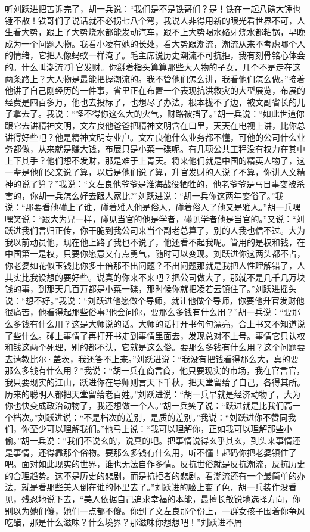 \documentclass[12pt,oneside]{book}
\begin{document}
听刘跃进把苦诉完了，胡一兵说：``我们是不是铁哥们？是！铁在一起八磅大锤也锤不散！铁哥们了说话就不必拐七八个弯，我说人非得用新的眼光看世界不可，人生看大势，跟上了大势烧水都能发动汽车，跟不上大势喝水硌牙烧水都粘锅，早晚成为一个问题人物。我看小凌有她的长处，看大势跟潮流，潮流从来不考虑哪个人的情绪，它把人像蚂蚁一样淹了。毛主席说历史潮流不可抗拒，我有刻骨铭心体会的。什么叫潮流?升官发财。你掰着指头算算那些大人物的子女，几个不是走在这两条路上？大人物是最能把握潮流的。我不管他们怎么讲，我看他们怎么做。''接着他讲了自己刚经历的一件事，省里正在布置一个表现抗洪救灾的大型展览，布展的经费是四百多万，他也去投标了，也想尽了办法，根本拢不了边，被文副省长的儿子拿去了。我说：``怪不得你这么大的火气，财路被挡了。''胡一兵说：``如此世道你跟它去讲精神文明，文左良他爸爸把精神文明含在口里，天天在电视上讲，比你总讲得好些吧？他是精神文明专业户。文左良他什么业务都不懂，可他的公司什么业务都做，从来就是赚大钱，布展只是小菜一碟呢。有几项公共工程没有权力在其中上下其手？他们想不发财，那是难于上青天。将来他们就是中国的精英人物了，这一辈是他们父亲说了算，以后是他们说了算，升官发财的人说了不算，你讲人文精神的说了算？''我说：``文左良他爷爷是淮海战役牺牲的，他老爷爷是马日事变被杀害的，你胡一兵怎么好去跟人家比?''刘跃进说：``胡一兵你这两年变俗了。''我说：``那要看他碰上了谁，碰着雅人他是俗人，碰着俗人了他又是雅人。''胡一兵嘿嘿笑说：``跟大为兄一样，碰见当官的他是学者，碰见学者他是当官的。''又说：``刘跃进我们言归正传，你干脆到我公司来当个副老总算了，别的人我也信不过。大为我以前动员他，现在他上路了我也不说了，他还看不起我呢。管用的是权和钱，在中国第一是权，只要你愿意又有点勇气，随时可以变现。刘跃进你这两头都不占，你老婆如花似玉钱比你多十倍那不出问题？不出问题那就是我把人性理解错了，人其实比我设想的要好些。说真的你来不来吧？把公司做大了，那就不是几千几万块钱的事，到那天几百万都是小菜一碟，那时候你就把凌若云镇住了。''刘跃进摇头说：``想不好。''我说：``刘跃进他愿做个导师，就让他做个导师，你要他升官发财他很痛苦，他看得起那些俗事?他会问你，要那么多钱有什么用？''胡一兵说：``要那么多钱有什么用？这是大师说的话。大师的话打开书句句漂亮，合上书又不知道说了些什么。碰上事情了再打开书走到事情里面去，发现总对不上号。事情它只认权和钱这两个死理，别的都不认，它就是这么俗。要那么多钱有什么用？这个问题要去请教比尔·盖茨，我还答不上来。''刘跃进说：``我没有把钱看得那么大，真的要那么多钱有什么用？''我说：``胡一兵在商言商，他只要现实的市场，我在官言官，我只要现实的江山，跃进你在导师则言天下千秋，把天堂留给了自己，各得其所。历来的聪明人都把天堂留给老百姓。''刘跃进说：``胡一兵早就是经济动物了，大为你也快变成政治动物了，我还想做一个人。''胡一兵笑了说：``跃进就是比我们高一个档次。''刘跃进说：``不是档次的差别，是质的差别。''我说：``刘跃进你不赞同我们，你至少可以理解我们。''他马上说：``我可以理解你，正如我可以理解那些小偷。''胡一兵说：``我们不说玄的，说真的吧。把事情说得玄乎其玄，到头来事情还是事情，还得靠那个俗物。要那么多钱有什么用，听不懂！起码你把老婆镇住了吧。面对如此现实的世界，谁也无法自作多情。反抗世俗就是反抗潮流，反抗历史的合理趋势。这不是历史的悲剧，而是抗拒者的悲剧。看潮流还有一个最简单的办法，就是看那些美人倒在谁的怀里去了。''刘跃进的脸上变了色，胡一兵装作没看见，残忍地说下去，``美人依据自己追求幸福的本能，最擅长敏锐地选择方向，你别以为她们傻，她们一点都不傻。你到了文左良那个份上，一群女孩子围着你争风吃醋，那是什么滋味？什么境界？那滋味你想想吧！''刘跃进不屑
\end{document}
